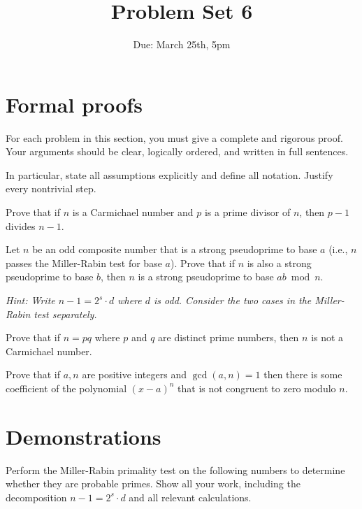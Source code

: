 \documentclass[12pt]{exam}
\begin{document}
\title{Problem Set 6}
\date{Due: March 25th, 5pm}
\maketitle



\section{Formal proofs}
For each problem in this section, you must give a complete and rigorous proof. Your arguments should be clear, logically ordered, and written in full sentences.

In particular, state all assumptions explicitly and define all notation. Justify every nontrivial step. 

\begin{questions}
\question[1] Prove that if $n$ is a Carmichael number and $p$ is a prime divisor of $n$, then $p - 1$ divides $n - 1$.


\question[1] Let $n$ be an odd composite number that is a strong pseudoprime to base $a$ (i.e., $n$ passes the Miller-Rabin test for base $a$). Prove that if $n$ is also a strong pseudoprime to base $b$, then $n$ is a strong pseudoprime to base $ab \bmod n$.

\textit{Hint: Write $n - 1 = 2^s \cdot d$ where $d$ is odd. Consider the two cases in the Miller-Rabin test separately.}

\question[1] Prove that if $n = pq$ where $p$ and $q$ are distinct prime numbers, then $n$ is not a Carmichael number.

\question[1] Prove that if $a, n$ are positive integers and $\gcd(a,n) = 1$ then there is some coefficient of the polynomial $(x - a)^n$ that is not congruent to zero modulo $n$.


\section{Demonstrations}

\question[1] Perform the Miller-Rabin primality test on the following numbers to determine whether they are probable primes. Show all your work, including the decomposition $n - 1 = 2^s \cdot d$ and all relevant calculations.


\end{questions}
\end{document}
